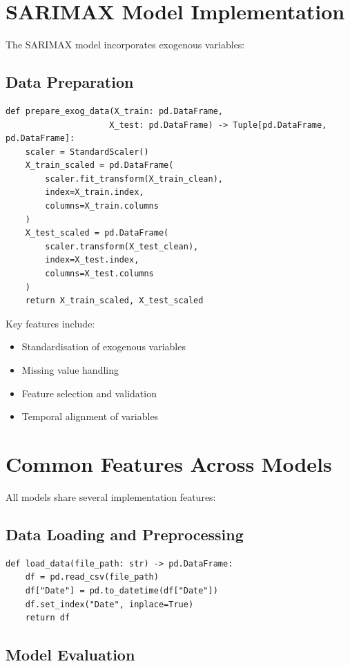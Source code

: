 \documentclass[12pt,a4paper]{report}
\begin{document}
\section{SARIMAX Model Implementation}
The SARIMAX model incorporates exogenous variables:

\subsection{Data Preparation}
\begin{verbatim}
def prepare_exog_data(X_train: pd.DataFrame, 
                     X_test: pd.DataFrame) -> Tuple[pd.DataFrame, pd.DataFrame]:
    scaler = StandardScaler()
    X_train_scaled = pd.DataFrame(
        scaler.fit_transform(X_train_clean),
        index=X_train.index,
        columns=X_train.columns
    )
    X_test_scaled = pd.DataFrame(
        scaler.transform(X_test_clean),
        index=X_test.index,
        columns=X_test.columns
    )
    return X_train_scaled, X_test_scaled
\end{verbatim}

Key features include:
\begin{itemize}
    \item Standardisation of exogenous variables
    \item Missing value handling
    \item Feature selection and validation
    \item Temporal alignment of variables
\end{itemize}

\section{Common Features Across Models}
All models share several implementation features:

\subsection{Data Loading and Preprocessing}

\begin{verbatim}
def load_data(file_path: str) -> pd.DataFrame:
    df = pd.read_csv(file_path)
    df["Date"] = pd.to_datetime(df["Date"])
    df.set_index("Date", inplace=True)
    return df
\end{verbatim}

\subsection{Model Evaluation}
\end{document}
